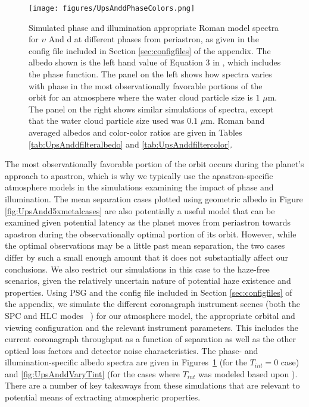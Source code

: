 \documentclass[12pt, letterpaper]{aastex631}
\begin{document}
 \begin{figure}[t]
  \centering
  \texttt{[image: figures/UpsAnddPhaseColors.png]}
  \caption{Simulated phase and illumination appropriate Roman model spectra for $\upsilon$ And d at different phases from periastron, as given in the config file included in Section \ref{sec:configfiles} of the appendix.  The albedo shown is the left hand value of Equation 3 in \textcite{2010ApJ...724..189C}, which includes the phase function. The panel on the left shows how spectra varies with phase in the most observationally favorable portions of the orbit for an atmosphere where the water cloud particle size is $1$ $\mu$m. The panel on the right shows similar simulations of spectra, except that the water cloud particle size used was $0.1$ $\mu$m.  Roman band averaged albedos and color-color ratios are given in Tables \ref{tab:UpsAnddfilteralbedo} and \ref{tab:UpsAnddfiltercolor}.}
  \label{fig:UpsAnddpphasecolors}
\end{figure}

The most observationally favorable portion of the orbit occurs during the planet's approach to apastron, which is why we typically use the apastron-specific atmosphere models in the simulations examining the impact of phase and illumination.  The mean separation cases plotted using geometric albedo in Figure \ref{fig:UpsAndd5xmetalcases} are also potentially a useful model that can be examined given potential latency as the planet moves from periastron towards apastron during the observationally optimal portion of its orbit. However, while the optimal observations may be a little past mean separation, the two cases differ by such a small enough amount that it does not substantially affect our conclusions.  We also restrict our simulations in this case to the haze-free scenarios, given the relatively uncertain nature of potential haze existence and properties. Using PSG and the config file included in Section \ref{sec:configfiles} of the appendix, we simulate the different coronagraph instrument scenes (both the SPC and HLC modes ~\citep{Mennesson2020arXiv}) for our atmosphere model, the appropriate orbital and viewing configuration and the relevant instrument parameters.  This includes the current coronagraph throughput as a function of separation as well as the other optical loss factors and detector noise characteristics.  The phase- and illumination-specific albedo spectra are given in Figures~\ref{fig:UpsAnddpphasecolors} (for the $T_{int}=0$ case) and \ref{fig:UpsAnddVaryTint} (for the cases where $T_{int}$ was modeled based upon \textcite{marley_mark_2018_1309035}).  There are a number of key takeaways from these simulations that are relevant to potential means of extracting atmospheric properties.  
\end{document}
